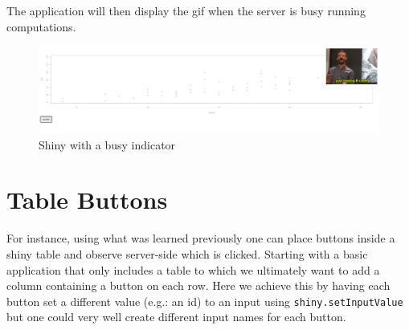 \documentclass[
]{krantz}
\makeatletter
\newenvironment{Shaded}{\begin{snugshade}}{\end{snugshade}}
\newcommand{\ControlFlowTok}[1]{\textcolor[rgb]{0.27,0.27,0.27}{\textbf{#1}}}
\newcommand{\DataTypeTok}[1]{\textcolor[rgb]{0.27,0.27,0.27}{#1}}
\newcommand{\KeywordTok}[1]{\textcolor[rgb]{0.27,0.27,0.27}{\textbf{#1}}}
\newcommand{\NormalTok}[1]{#1}
\newcommand{\OperatorTok}[1]{\textcolor[rgb]{0.43,0.43,0.43}{\textbf{#1}}}
\newcommand{\OtherTok}[1]{\textcolor[rgb]{0.37,0.37,0.37}{#1}}
\newcommand{\StringTok}[1]{\textcolor[rgb]{0.5,0.5,0.5}{#1}}
\newenvironment{kframe}{%
\medskip{}
\setlength{\fboxsep}{.8em}
 \def\at@end@of@kframe{}%
 \ifinner\ifhmode%
  \def\at@end@of@kframe{\end{minipage}}%
  \begin{minipage}{\columnwidth}%
 \fi\fi%
 \def\FrameCommand##1{\hskip\@totalleftmargin \hskip-\fboxsep
 \colorbox{shadecolor}{##1}\hskip-\fboxsep
     \hskip-\linewidth \hskip-\@totalleftmargin \hskip\columnwidth}%
 \MakeFramed {\advance\hsize-\width
   \@totalleftmargin\z@ \linewidth\hsize
   \@setminipage}}%
 {\par\unskip\endMakeFramed%
 \at@end@of@kframe}
\renewenvironment{Shaded}{\begin{kframe}}{\end{kframe}}
\makeatother
\begin{document}
The application will then display the gif when the server is busy running computations.

\begin{figure}
\centering
\includegraphics{images/shiny-events.png}
\caption{Shiny with a busy indicator}
\end{figure}

\hypertarget{shiny-tips-table-btn}{%
\section{Table Buttons}\label{shiny-tips-table-btn}}

For instance, using what was learned previously one can place buttons inside a shiny table and observe server-side which is clicked. Starting with a basic application that only includes a table to which we ultimately want to add a column containing a button on each row. Here we achieve this by having each button set a different value (e.g.: an id) to an input using \texttt{shiny.setInputValue} but one could very well create different input names for each button.

\begin{Shaded}
\end{Shaded}
\end{document}
